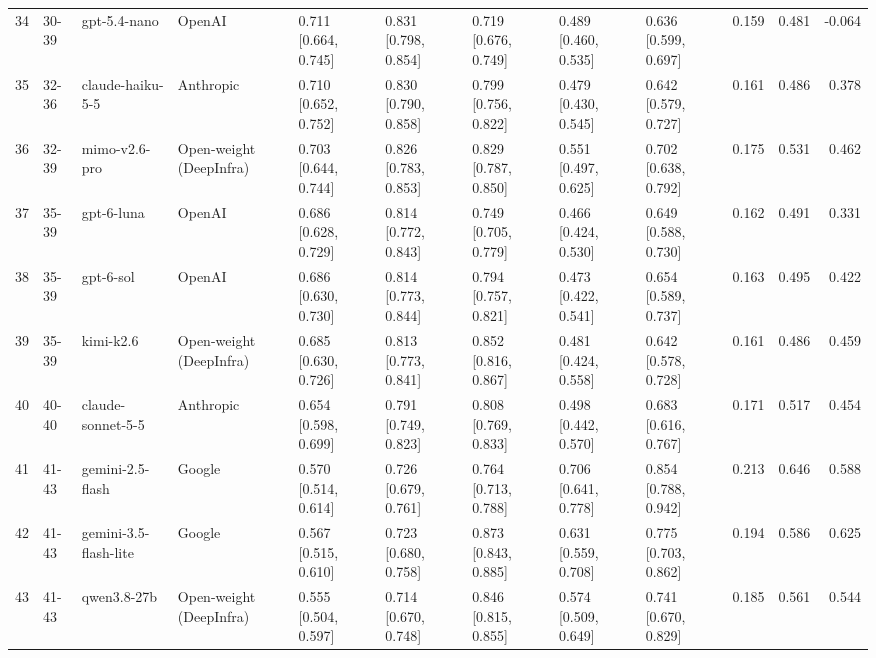 \begin{table}
\begin{tabular}{rllllllllrrr}
34 & 30-39 & gpt-5.4-nano & OpenAI & 0.711 [0.664, 0.745] & 0.831 [0.798, 0.854] & 0.719 [0.676, 0.749] & 0.489 [0.460, 0.535] & 0.636 [0.599, 0.697] & 0.159 & 0.481 & -0.064 \\
35 & 32-36 & claude-haiku-5-5 & Anthropic & 0.710 [0.652, 0.752] & 0.830 [0.790, 0.858] & 0.799 [0.756, 0.822] & 0.479 [0.430, 0.545] & 0.642 [0.579, 0.727] & 0.161 & 0.486 & 0.378 \\
36 & 32-39 & mimo-v2.6-pro & Open-weight (DeepInfra) & 0.703 [0.644, 0.744] & 0.826 [0.783, 0.853] & 0.829 [0.787, 0.850] & 0.551 [0.497, 0.625] & 0.702 [0.638, 0.792] & 0.175 & 0.531 & 0.462 \\
37 & 35-39 & gpt-6-luna & OpenAI & 0.686 [0.628, 0.729] & 0.814 [0.772, 0.843] & 0.749 [0.705, 0.779] & 0.466 [0.424, 0.530] & 0.649 [0.588, 0.730] & 0.162 & 0.491 & 0.331 \\
38 & 35-39 & gpt-6-sol & OpenAI & 0.686 [0.630, 0.730] & 0.814 [0.773, 0.844] & 0.794 [0.757, 0.821] & 0.473 [0.422, 0.541] & 0.654 [0.589, 0.737] & 0.163 & 0.495 & 0.422 \\
39 & 35-39 & kimi-k2.6 & Open-weight (DeepInfra) & 0.685 [0.630, 0.726] & 0.813 [0.773, 0.841] & 0.852 [0.816, 0.867] & 0.481 [0.424, 0.558] & 0.642 [0.578, 0.728] & 0.161 & 0.486 & 0.459 \\
40 & 40-40 & claude-sonnet-5-5 & Anthropic & 0.654 [0.598, 0.699] & 0.791 [0.749, 0.823] & 0.808 [0.769, 0.833] & 0.498 [0.442, 0.570] & 0.683 [0.616, 0.767] & 0.171 & 0.517 & 0.454 \\
41 & 41-43 & gemini-2.5-flash & Google & 0.570 [0.514, 0.614] & 0.726 [0.679, 0.761] & 0.764 [0.713, 0.788] & 0.706 [0.641, 0.778] & 0.854 [0.788, 0.942] & 0.213 & 0.646 & 0.588 \\
42 & 41-43 & gemini-3.5-flash-lite & Google & 0.567 [0.515, 0.610] & 0.723 [0.680, 0.758] & 0.873 [0.843, 0.885] & 0.631 [0.559, 0.708] & 0.775 [0.703, 0.862] & 0.194 & 0.586 & 0.625 \\
43 & 41-43 & qwen3.8-27b & Open-weight (DeepInfra) & 0.555 [0.504, 0.597] & 0.714 [0.670, 0.748] & 0.846 [0.815, 0.855] & 0.574 [0.509, 0.649] & 0.741 [0.670, 0.829] & 0.185 & 0.561 & 0.544 \\
\bottomrule
\end{tabular}
\end{table}
